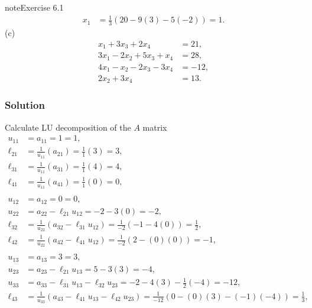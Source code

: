 \documentclass[letterpaper,10pt,english]{jupyterBook}
\begin{document}
\begin{sphinxadmonition}{note}{Exercise 6.1}
\begin{align*}
    x_{1} &= \frac{1}{3}\left(20 - 9\left(3\right) - 5\left(-2\right)\right) = 1.
\end{align*}
\sphinxAtStartPar
(c)
\begin{align*}
      x_1         + 3 x_3 + 2 x_4 &=  21,\\
    3 x_1 - 2 x_2 + 5 x_3 +   x_4 &=  28,\\
    4 x_1 -   x_2 - 2 x_3 - 3 x_4 &= -12,\\
            2 x_2         + 3 x_4 &=  13.
\end{align*}\subsubsection*{Solution}

\sphinxAtStartPar
Calculate LU decomposition of the \(A\) matrix
\begin{align*}
    u_{11} &= a_{11} = 1 = 1, \\
    \ell_{21} &= \frac{1}{u_{11}}\left(a_{21}\right) = \frac{1}{1}\left(3\right) = 3, \\
    \ell_{31} &= \frac{1}{u_{11}}\left(a_{31}\right) = \frac{1}{1}\left(4\right) = 4, \\
    \ell_{41} &= \frac{1}{u_{11}}\left(a_{41}\right) = \frac{1}{1}\left(0\right) = 0, \\
    \\
    u_{12} &= a_{12} = 0 = 0, \\
    u_{22} &= a_{22} - \ell_{21} u_{12} = -2 - 3\left(0\right) = -2, \\
    \ell_{32} &= \frac{1}{u_{22}}\left(a_{32} - \ell_{31} u_{12}\right) = \frac{1}{-2}\left(-1 - 4\left(0\right)\right) = \frac{1}{2}, \\
    \ell_{42} &= \frac{1}{u_{22}}\left(a_{42} - \ell_{41} u_{12}\right) = \frac{1}{-2}\left(2 - \left(0\right)\left(0\right)\right) = -1, \\
    \\
    u_{13} &= a_{13} = 3 = 3, \\
    u_{23} &= a_{23} - \ell_{21} u_{13} = 5 - 3\left(3\right) = -4, \\
    u_{33} &= a_{33} - \ell_{31} u_{13} - \ell_{32} u_{23} = -2 - 4\left(3\right) - \frac{1}{2}\left(-4\right) = -12, \\
    \ell_{43} &= \frac{1}{u_{33}}\left(a_{43} - \ell_{41} u_{13} - \ell_{42} u_{23}\right) = \frac{1}{-12}\left(0 - \left(0\right)\left(3\right) - \left(-1\right)\left(-4\right)\right) = \frac{1}{3}, \\
    \\

\end{align*}
\end{sphinxadmonition}
\end{document}
